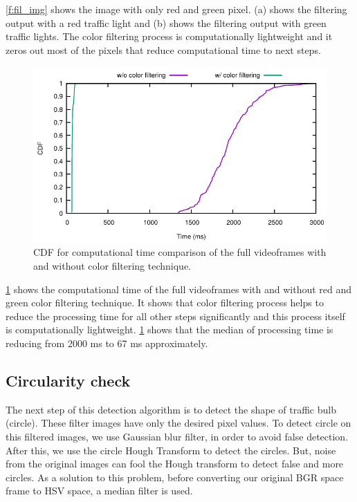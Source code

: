 \ref{f:fil_img} shows the image with only red and green pixel.
(a) shows the filtering output with a red traffic light and (b) shows the filtering output with green traffic lights.
The color filtering process is computationally lightweight and it zeros out most of the pixels that reduce computational time to next steps.

\begin{figure}[h]
\centering
\includegraphics[width=5.2in]{plots/cdf_clrfil_full.pdf}
\caption{CDF for computational time comparison of the full videoframes with and without color filtering technique.}
\label{f:clrfil}
\end{figure}

\ref{f:clrfil} shows the computational time of the full videoframes with and without red and green color filtering technique.
It shows that color filtering process helps to reduce the processing time for all other steps significantly and this process itself is computationally lightweight.
\ref{f:clrfil} shows that the median of processing time is reducing from 2000 ms to 67 ms approximately. 

\subsection{Circularity check}
The next step of this detection algorithm is to detect the shape of traffic bulb (circle).
These filter images have only the desired pixel values.
To detect circle on this filtered images, we use Gaussian blur filter, in order to avoid false detection.
After this, we use the circle Hough Transform \cite{hough_circle} to detect the circles.
But, noise from the original images can fool the Hough transform to detect false and more circles.
As a solution to this problem, before converting our original BGR space frame to HSV space, a median filter is used.

